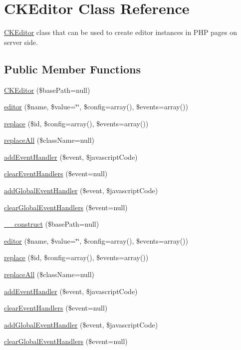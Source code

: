 \hypertarget{classCKEditor}{
\section{CKEditor Class Reference}
\label{classCKEditor}
}
\hyperlink{classCKEditor}{CKEditor} class that can be used to create editor instances in PHP pages on server side.  


\subsection*{Public Member Functions}
\begin{CompactItemize}
\item 
\hyperlink{classCKEditor_17bed5f81d2db60032f0b384a9b4e237}{CKEditor} (\$basePath=null)
\item 
\hyperlink{classCKEditor_bd6f81ca7539169b55b8f0556bc594c6}{editor} (\$name, \$value=\char`\"{}\char`\"{}, \$config=array(), \$events=array())
\item 
\hyperlink{classCKEditor_82ebacb89f96be38393ebd53a6a9ab52}{replace} (\$id, \$config=array(), \$events=array())
\item 
\hyperlink{classCKEditor_31836dd682c8d9d6bc5d59063b37c8b8}{replaceAll} (\$className=null)
\item 
\hyperlink{classCKEditor_a9617d6c05e2ecca9f59b89e08dfc311}{addEventHandler} (\$event, \$javascriptCode)
\item 
\hyperlink{classCKEditor_1b92304a2eef124810dd2be4f30e18f9}{clearEventHandlers} (\$event=null)
\item 
\hyperlink{classCKEditor_3bc88e349a30e84ddbdee5d55950ddb1}{addGlobalEventHandler} (\$event, \$javascriptCode)
\item 
\hyperlink{classCKEditor_8eff2f69ca071cf793b719ef4ddea97e}{clearGlobalEventHandlers} (\$event=null)
\item 
\hyperlink{classCKEditor_e58532c32cc95a2c2c34c6135024a428}{\_\-\_\-construct} (\$basePath=null)
\item 
\hyperlink{classCKEditor_bd6f81ca7539169b55b8f0556bc594c6}{editor} (\$name, \$value=\char`\"{}\char`\"{}, \$config=array(), \$events=array())
\item 
\hyperlink{classCKEditor_82ebacb89f96be38393ebd53a6a9ab52}{replace} (\$id, \$config=array(), \$events=array())
\item 
\hyperlink{classCKEditor_31836dd682c8d9d6bc5d59063b37c8b8}{replaceAll} (\$className=null)
\item 
\hyperlink{classCKEditor_a9617d6c05e2ecca9f59b89e08dfc311}{addEventHandler} (\$event, \$javascriptCode)
\item 
\hyperlink{classCKEditor_1b92304a2eef124810dd2be4f30e18f9}{clearEventHandlers} (\$event=null)
\item 
\hyperlink{classCKEditor_3bc88e349a30e84ddbdee5d55950ddb1}{addGlobalEventHandler} (\$event, \$javascriptCode)
\item 
\hyperlink{classCKEditor_8eff2f69ca071cf793b719ef4ddea97e}{clearGlobalEventHandlers} (\$event=null)
\end{CompactItemize}
